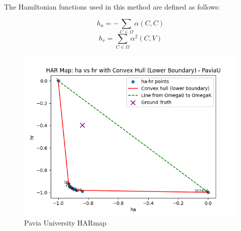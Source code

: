 The Hamiltonian functions used in this method are defined as follows:

\[
h_a = - \sum_{C \in \Omega} \alpha(C, C)
\]
\[
h_r = \sum_{C \in \Omega} \alpha^2(C, V)
\]


\begin{figure}[htbp]
    \centering
    \begin{minipage}{0.45\textwidth}
        \centering
        \includegraphics[width=\linewidth]{figures/PaviaU_HARmap.png}
        \caption{Pavia University HARmap}
        \label{fig:pavia_university_har}
    \end{minipage}\hfill
    \begin{minipage}{0.45\textwidth}
    \end{minipage}
\end{figure}

